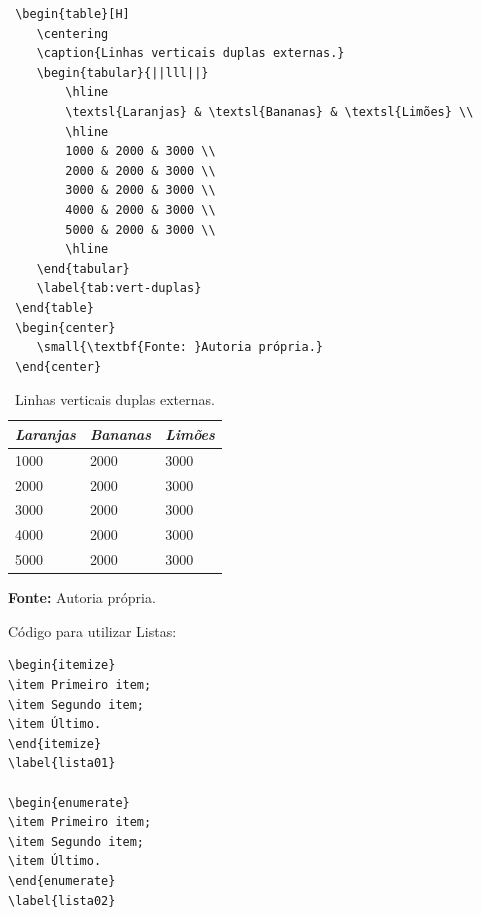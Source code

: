 \documentclass[a4,12pt]{modelo}
\begin{document}
 \begin{verbatim}   
 \begin{table}[H]  
 	\centering  
 	\caption{Linhas verticais duplas externas.} 
 	\begin{tabular}{||lll||}  
 		\hline  
 		\textsl{Laranjas} & \textsl{Bananas} & \textsl{Limões} \\  
 		\hline  
 		1000 & 2000 & 3000 \\  
 		2000 & 2000 & 3000 \\ 
 		3000 & 2000 & 3000 \\  
 		4000 & 2000 & 3000 \\  
 		5000 & 2000 & 3000 \\  
 		\hline  
 	\end{tabular}   
 	\label{tab:vert-duplas}   
 \end{table} 
 \begin{center}
 	\small{\textbf{Fonte: }Autoria própria.}
 \end{center}  
\end{verbatim} 
 
  \begin{table}[H]  
 	\centering  
 	\caption{Linhas verticais duplas externas.} 
 	\begin{tabular}{||lll||}  
 		\hline  
 		\textsl{Laranjas} & \textsl{Bananas} & \textsl{Limões} \\  
 		\hline  
 		1000 & 2000 & 3000 \\  
 		2000 & 2000 & 3000 \\ 
 		3000 & 2000 & 3000 \\  
 		4000 & 2000 & 3000 \\  
 		5000 & 2000 & 3000 \\  
 		\hline  
 	\end{tabular}   
 	\label{tab:vert-duplas}   
 \end{table} 
 \begin{center}
 	\small{\textbf{Fonte: }Autoria própria.}
 \end{center}
 
 Código para utilizar Listas: 
\begin{verbatim}
\begin{itemize}  
\item Primeiro item;  
\item Segundo item; 
\item Último.
\end{itemize} 
\label{lista01} 
 
\begin{enumerate}  
\item Primeiro item;  
\item Segundo item; 
\item Último.
\end{enumerate} 
\label{lista02} 
 
\end{verbatim} 
\end{document}
